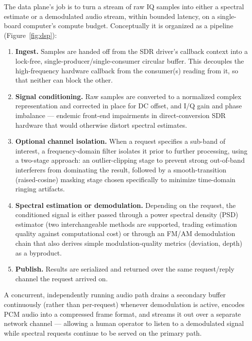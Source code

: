 \documentclass[11pt,a4paper]{article}
\begin{document}
The data plane's job is to turn a stream of raw IQ samples into either a spectral estimate or
a demodulated audio stream, within bounded latency, on a single-board computer's compute
budget. Conceptually it is organized as a pipeline (Figure~\ref{fig:dsp}):

\begin{enumerate}[leftmargin=1.4em]
    \item \textbf{Ingest.} Samples are handed off from the SDR driver's callback context into
    a lock-free, single-producer/single-consumer circular buffer. This decouples the
    high-frequency hardware callback from the consumer(s) reading from it, so that neither
    can block the other.
    \item \textbf{Signal conditioning.} Raw samples are converted to a normalized complex
    representation and corrected in place for DC offset, and I/Q gain and phase imbalance ---
    endemic front-end impairments in direct-conversion SDR hardware that would otherwise
    distort spectral estimates.
    \item \textbf{Optional channel isolation.} When a request specifies a sub-band of
    interest, a frequency-domain filter isolates it prior to further processing, using a
    two-stage approach: an outlier-clipping stage to prevent strong out-of-band interferers
    from dominating the result, followed by a smooth-transition (raised-cosine) masking
    stage chosen specifically to minimize time-domain ringing artifacts.
    \item \textbf{Spectral estimation or demodulation.} Depending on the request, the
    conditioned signal is either passed through a power spectral density (PSD) estimator
    (two interchangeable methods are supported, trading estimation quality against
    computational cost) or through an FM/AM demodulation chain that also derives simple
    modulation-quality metrics (deviation, depth) as a byproduct.
    \item \textbf{Publish.} Results are serialized and returned over the same request/reply
    channel the request arrived on.
\end{enumerate}

A concurrent, independently running audio path drains a secondary buffer continuously
(rather than per-request) whenever demodulation is active, encodes PCM audio into a
compressed frame format, and streams it out over a separate network channel --- allowing a
human operator to listen to a demodulated signal while spectral requests continue to be
served on the primary path.
\end{document}
